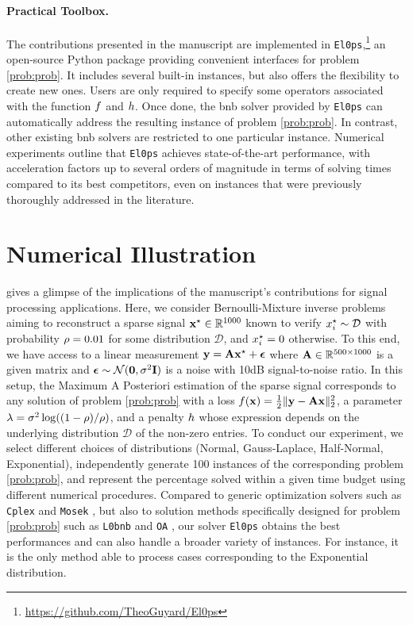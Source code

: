 \documentclass[11pt]{article}
\begin{document}
\paragraph{Practical Toolbox.}
The contributions presented in the manuscript are implemented in \texttt{El0ps},\footnote{\url{https://github.com/TheoGuyard/El0ps}} an open-source Python package providing convenient interfaces for problem \eqref{prob:prob}.
It includes several built-in instances, but also offers the flexibility to create new ones.
Users are only required to specify some operators associated with the function $f$ and $h$.
Once done, the \gls{bnb} solver provided by \texttt{El0ps} can automatically address the resulting instance of problem \eqref{prob:prob}.
In contrast, other existing \gls{bnb} solvers are restricted to one particular instance.
Numerical experiments outline that \texttt{El0ps} achieves state-of-the-art performance, with acceleration factors up to several orders of magnitude in terms of solving times compared to its best competitors, even on instances that were previously thoroughly addressed in the literature.

\section{Numerical Illustration}
\label{sec:numerics}

 gives a glimpse of the implications of the manuscript's contributions for signal processing applications.
Here, we consider Bernoulli-Mixture inverse problems \cite{soussen2011bernoulli} aiming to reconstruct a sparse signal $\groundtruth \in \kR^{1000}$ known to verify $x_{i}^{\star} \sim \mathcal{D}$ with probability $\rho = 0.01$ for some distribution $\mathcal{D}$, and $x_{i}^{\star}=0$ otherwise. 
To this end, we have access to a linear measurement $\mathbf{y} = \mathbf{A}\mathbf{x}^{\star} + \boldsymbol{\epsilon}$ where $\dic \in \kR^{500 \times 1000}$ is a given matrix and $\boldsymbol{\epsilon} \sim \mathcal{N}(\mathbf{0},\sigma^2 \mathbf{I})$ is a noise with 10dB signal-to-noise ratio.
In this setup, the Maximum A Posteriori estimation of the sparse signal corresponds to any solution of problem \eqref{prob:prob} with
a loss $f(\mathbf{x}) = \frac{1}{2}\|\mathbf{y} - \mathbf{A}\mathbf{x}\|_2^2$,
a parameter $\lambda = \sigma^2\log((1-\rho)/\rho)$,
and a penalty $h$ whose expression depends on the underlying distribution $\mathcal{D}$ of the non-zero entries.
To conduct our experiment, we select different choices of distributions (Normal, Gauss-Laplace, Half-Normal, Exponential), independently generate 100 instances of the corresponding problem \eqref{prob:prob}, and represent the percentage solved within a given time budget using different numerical procedures.
Compared to generic optimization solvers such as \texttt{Cplex} and \texttt{Mosek} \cite{kronqvist2019review}, but also to solution methods specifically designed for problem \eqref{prob:prob} such as \texttt{L0bnb} \cite{hazimeh2022sparse} and \texttt{OA} \cite{bertsimas2021unified}, our solver \texttt{El0ps} obtains the best performances and can also handle a broader variety of instances. 
For instance, it is the only method able to process cases corresponding to the Exponential distribution.
\end{document}
